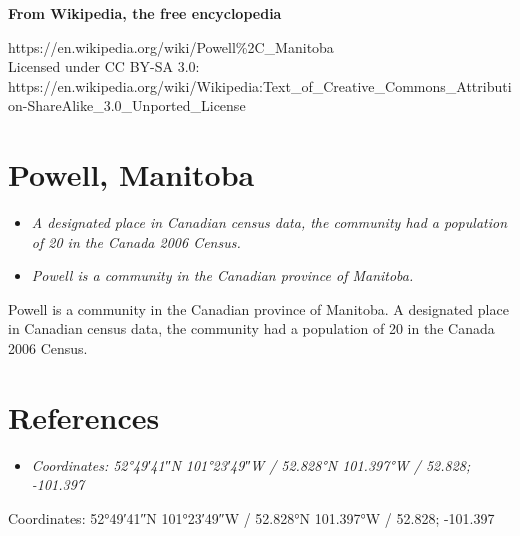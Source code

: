 \textbf{From Wikipedia, the free encyclopedia}

https://en.wikipedia.org/wiki/Powell\%2C\_Manitoba\\
Licensed under CC BY-SA 3.0:\\
https://en.wikipedia.org/wiki/Wikipedia:Text\_of\_Creative\_Commons\_Attribution-ShareAlike\_3.0\_Unported\_License

\section{Powell, Manitoba}\label{powell-manitoba}

\begin{itemize}
\item
  \emph{A designated place in Canadian census data, the community had a
  population of 20 in the Canada 2006 Census.}
\item
  \emph{Powell is a community in the Canadian province of Manitoba.}
\end{itemize}

Powell is a community in the Canadian province of Manitoba. A designated
place in Canadian census data, the community had a population of 20 in
the Canada 2006 Census.

\section{References}\label{references}

\begin{itemize}
\item
  \emph{Coordinates: 52°49′41″N 101°23′49″W﻿ / ﻿52.828°N 101.397°W﻿ /
  52.828; -101.397}
\end{itemize}

Coordinates: 52°49′41″N 101°23′49″W﻿ / ﻿52.828°N 101.397°W﻿ / 52.828;
-101.397
